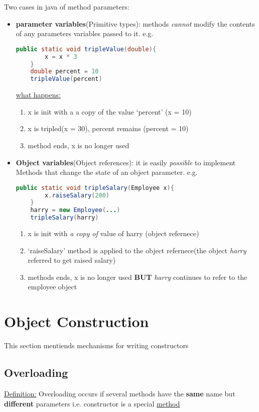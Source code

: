 \documentclass[12pt]{article}
\begin{document}
Two cases in java of method parameters:
\begin{itemize}
    \item \textbf{parameter variables}(Primitive types): methods \textit{cannot} modify the contents
    of any parameters variables passed to it.\newline
    e.g.
    \begin{lstlisting}[language=Java]
    public static void tripleValue(double){
        x = x * 3
    }
    double percent = 10
    tripleValue(percent)
    \end{lstlisting}
    \underline{what happens:}
    \begin{enumerate}
        \item x is init with a a copy of the value `percent' (x = 10)
        \item x is tripled(x = 30), percent remains (percent = 10)
        \item method ends, x is no longer used
    \end{enumerate}

    \item \textbf{Object variables}(Object references): it is easily \textit{possible} to implement Methods
    that change the state of an object parameter.\newline
    e.g.
    \begin{lstlisting}[language=Java]
    public static void tripleSalary(Employee x){
        x.raiseSalary(200)
    }
    harry = new Employee(...)
    tripleSalary(harry)
    \end{lstlisting}
    \begin{enumerate}
        \item x is init with \textit{a copy of} value of harry (object refernece)
        \item `raiseSalary' method is applied to the object refernece(the object \textit{harry} referred to get raised salary)
        \item methods ends, x is no longer used \textbf{BUT} \textit{harry} continues to refer to the employee object
    \end{enumerate}
\end{itemize}

\section{Object Construction}
This section mentiends mechanisms for writing constructors
\subsection{Overloading}
\underline{Definition:} Overloading occurs if several methods have the \textbf{same} name but \textbf{different} parameters
i.e. constructor is a special \underline{method}
\end{document}
